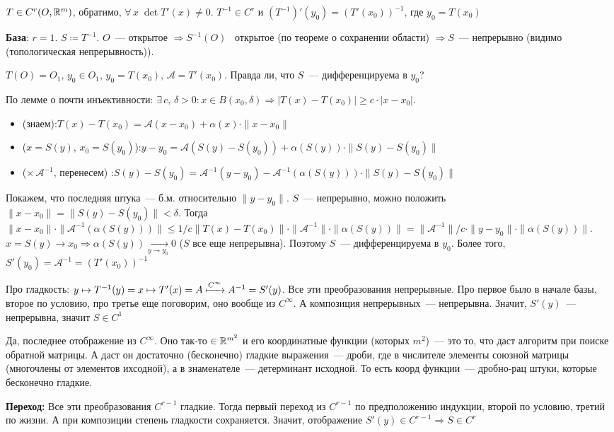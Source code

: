 \begin{Theorem*}
    $T\in C^r(O, \rmy)$, обратимо, $\forall\,x\;\det T'(x)\neq 0$. \THEN $T^{-1}\in C^r$ и $(T^{-1})'(y_0)=(T'(x_0))^{-1}$, где $y_0=T(x_0)$
\end{Theorem*}
\begin{Proof}
\newcommand{\TopA}{\mathcal{A}}
    \textbf{База}: $r=1$. $S\coloneqq T^{-1}$. $O$~--- открытое $\Rightarrow S^{-1}(O)$~ открытое (по теореме о сохранении области) $\Rightarrow S$~--- непрерывно (видимо (топологическая непрерывность)).
    
    $T(O)=O_1,\,y_0\in O_1,\,y_0=T(x_0),\,\TopA=T'(x_0)$. Правда ли, что $S$~--- дифференцируема в $y_0$?
    
    По лемме о почти инъективности: $\exists\,c,\,\delta>0:x\in B(x_0,\delta)\Rightarrow |T(x)-T(x_0)|\geqslant c\cdot|x-x_0|$.
    \begin{itemize}
        \item (знаем):\quad $T(x)-T(x_0)=\TopA(x-x_0)+\alpha(x)\cdot\|x-x_0\|$
        \item ($x=S(y),\,x_0=S(y_0)$):\quad $y-y_0=\TopA(S(y)-S(y_0))+\alpha(S(y))\cdot\|S(y)-S(y_0)\|$ 
        \item ($\times\,\TopA^{-1}$, перенесем) :\quad $S(y)-S(y_0)=\TopA^{-1}(y-y_0)-\TopA^{-1}(\alpha(S(y)))\cdot\|S(y)-S(y_0)\|$
    \end{itemize}
    
    Покажем, что последняя штука~--- б.м. относительно $\|y-y_0\|$. $S$~--- непрерывно, можно положить $\|x-x_0\|=\|S(y)-S(y_0)\|<\delta$. Тогда $\|x-x_0\|\cdot\|\TopA^{-1}(\alpha(S(y)))\|\leqslant 1/c \|T(x)-T(x_0)\|\cdot\|\TopA^{-1}\|\cdot\|\alpha(S(y))\|=\|\TopA^{-1}\|/c\cdot\|y-y_0\|\cdot\|\alpha(S(y))\|$. $x=S(y)\to x_0\Rightarrow\alpha(S(y))\xrightarrow[y\to y_0]{}0$ ($S$ все еще непрерывна). Поэтому $S$~--- дифференцируема в $y_0$. Более того, $S'(y_0)=\TopA^{-1}=(T'(x_0))^{-1}$
    
    Про гладкость: $y\mapsto T^{-1}(y)=x\mapsto T'(x)=A\xmapsto{C^\infty}A^{-1}=S'(y)$.
    Все эти преобразования непрерывные. Про первое было в начале базы, второе по условию, про третье еще поговорим, оно вообще из $C^\infty$. А композиция непрерывных~--- непрерывна. Значит, $S'(y)$~--- непрерывна, значит $S\in C^1$
    
    Да, последнее отображение из $C^\infty$. Оно так-то $\in \rmy[m^2]$ и его координатные функции (которых $m^2$)~--- это то, что даст алгоритм при поиске обратной матрицы. А даст он достаточно (бесконечно) гладкие выражения~--- дроби, где в числителе элементы союзной матрицы (многочлены от элементов ихсодной), а в знаменателе~--- детерминант исходной. То есть коорд функции~--- дробно-рац штуки, которые бесконечно гладкие.
    
    \textbf{Переход:} Все эти преобразования $C^{r-1}$ гладкие. Тогда первый переход из $C^{r-1}$ по предположению индукции, второй по условию, третий по жизни. А при композиции степень гладкости сохраняется. Значит, отображение $S'(y)\in C^{r-1}\Rightarrow S\in C^{r}$
\end{Proof}

